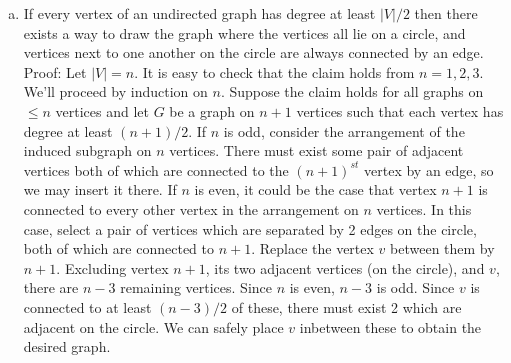 \documentclass{article}
\begin{document}
\begin{enumerate}[a.]
\item If every vertex of an undirected graph has degree at least $|V|/2$ then there exists a way to draw the graph where the vertices all lie on a circle, and vertices next to one another on the circle are always connected by an edge. Proof: Let $|V| = n$.  It is easy to check that the claim holds from $n=1, 2, 3$.  We'll proceed by induction on $n$.  Suppose the claim holds for all graphs on $\leq n $ vertices and let $G$ be a graph on $n+1$ vertices such that each vertex has degree at least $(n+1)/2$.  If $n$ is odd, consider the arrangement of the induced subgraph on $n$ vertices.  There must exist some pair of adjacent vertices both of which are connected to the $(n+1)^{st}$ vertex by an edge, so we may insert it there.  If $n$ is even, it could be the case that vertex $n+1$ is connected to every other vertex in the arrangement on $n$ vertices.  In this case, select a pair of vertices which are separated by 2 edges on the circle, both of which are connected to $n+1$.  Replace the vertex $v$ between them by $n+1$.  Excluding vertex $n+1$, its two adjacent vertices (on the circle), and $v$, there are $n-3$ remaining vertices.  Since $n$ is even, $n-3$ is odd.  Since $v$ is connected to at least $(n-3)/2$ of these, there must exist 2 which are adjacent on the circle.  We can safely place $v$ inbetween these to obtain the desired graph. 
\end{enumerate}
\end{document}
